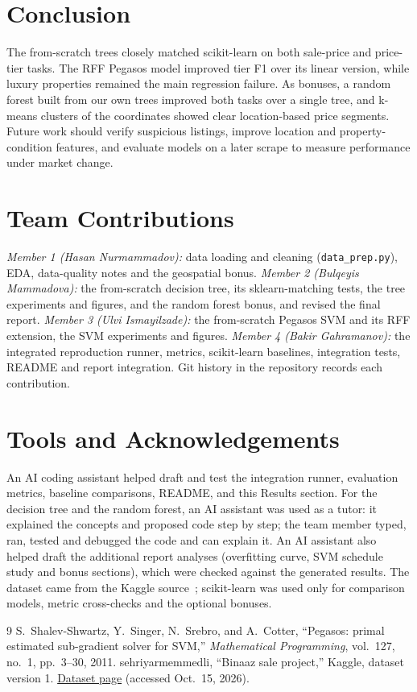 \documentclass[10pt,twocolumn,a4paper]{article}
\begin{document}
\section{Conclusion}
The from-scratch trees closely matched scikit-learn on both sale-price
and price-tier tasks. The RFF Pegasos model improved tier F1 over its
linear version, while luxury properties remained the main regression
failure. As bonuses, a random forest built from our own trees improved
both tasks over a single tree, and k-means clusters of the coordinates
showed clear location-based price segments. Future work should verify suspicious listings, improve location
and property-condition features, and evaluate models on a later scrape
to measure performance under market change.

\section*{Team Contributions}
\emph{Member 1 (Hasan Nurmammadov):} data loading and cleaning
(\texttt{data\_prep.py}), EDA, data-quality notes and the geospatial
bonus. \emph{Member 2 (Bulqeyis Mammadova):} the from-scratch decision
tree, its sklearn-matching tests, the tree experiments and figures, and
the random forest bonus, and revised the final report. \emph{Member 3 (Ulvi Ismayilzade):} the from-scratch
Pegasos SVM and its RFF extension, the SVM experiments and figures.
\emph{Member 4 (Bakir Gahramanov):} the integrated reproduction runner,
metrics, scikit-learn baselines, integration tests, README and report
integration. Git history in the repository records each contribution.

\section*{Tools and Acknowledgements}
An AI coding assistant helped draft and test the integration runner,
evaluation metrics, baseline comparisons, README, and this Results
section. For the decision tree and the random forest, an AI assistant
was used as a tutor: it explained the concepts and proposed code step by
step; the team member typed, ran, tested and debugged the code and can
explain it. An AI assistant also helped draft the additional report
analyses (overfitting curve, SVM schedule study and bonus sections),
which were checked against the generated results.
The dataset came from the Kaggle source~\cite{binaaz};
scikit-learn was used only for comparison models,
metric cross-checks and the optional bonuses.

\begin{thebibliography}{9}
S.~Shalev-Shwartz, Y.~Singer, N.~Srebro, and A.~Cotter,
``Pegasos: primal estimated sub-gradient solver for SVM,''
\emph{Mathematical Programming}, vol.~127, no.~1, pp.~3--30, 2011.
sehriyarmemmedli, ``Binaaz sale project,'' Kaggle, dataset version 1.
\href{https://www.kaggle.com/datasets/sehriyarmemmedli/binaaz-sale-project}{Dataset page}
(accessed Oct.~15, 2026).
\end{thebibliography}
\end{document}
